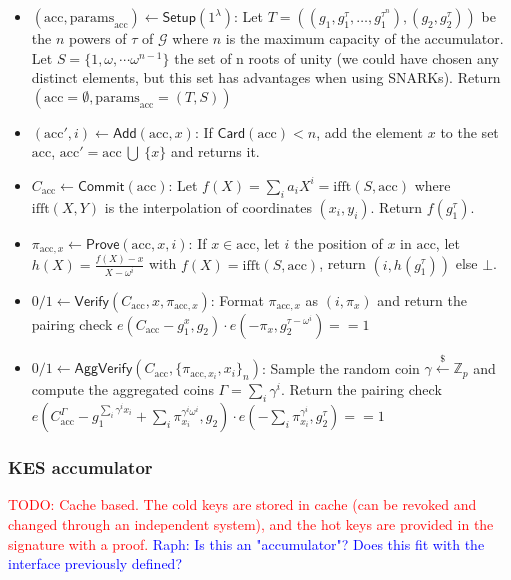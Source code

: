 \documentclass{article}
\newcommand{\isequal}{\ensuremath{==}\xspace}
\newcommand{\Zp}{\ensuremath{\mathbb{Z}_p}\xspace}
\newcommand{\e}[2]{\ensuremath{e(#1,\xspace #2)}\xspace}
\newcommand{\acc}{\ensuremath{\textrm{acc}}\xspace}
\newcommand{\pp}{\ensuremath{\textrm{params}}\xspace}
\newcommand{\Verify}{\ensuremath{\mathsf{Verify}}\xspace}
\newcommand{\AggVerify}{\ensuremath{\mathsf{AggVerify}}\xspace}
\newcommand{\Setup}{\ensuremath{\mathsf{Setup}}\xspace}
\newcommand{\Add}{\ensuremath{\mathsf{Add}}\xspace}
\newcommand{\Prove}{\ensuremath{\mathsf{Prove}}\xspace}
\newcommand{\Commit}{\ensuremath{\mathsf{Commit}}\xspace}
\newcommand{\sample}{\ensuremath{\xleftarrow{\$}}\xspace}
\newcommand{\raph}[1]{\textcolor{blue}{Raph: #1}\xspace}
\newcommand{\todo}[1]{\textcolor{red}{TODO: #1}\xspace}
\begin{document}
\begin{itemize}
    \item $(\acc, \pp_\acc) \leftarrow \Setup(1^\lambda)$: Let $T = ((g_1, g_1^\tau, \dots, g_1^{\tau^n}), (g_2, g_2^\tau))$ be the $n$ powers of $\tau$ of $\mathcal{G}$ where $n$ is the maximum capacity of the accumulator. Let $S =\{1, \omega, \cdots \omega^{n-1}\}$ the set of n roots of unity (we could have chosen any distinct elements, but this set has advantages when using SNARKs).  Return $(\acc = \emptyset, \pp_\acc = (T, S))$
    \item $(\acc', i) \leftarrow \Add(\acc, x)$: If $\textsf{Card}(\acc) < n$, add the element $x$ to the set \acc, $\acc' = \acc\ \bigcup\ \{x\}$ and returns it.
    \item $C_\acc \leftarrow \Commit(\acc)$: Let $f(X) = \sum_i a_i X^i = \text{ifft}(S, \acc)$ where $\text{ifft}(X,Y)$ is the interpolation of coordinates $(x_i,y_i)$. Return $f(g_1^\tau)$.
    \item $\pi_{\acc, x} \leftarrow \Prove(\acc, x, i)$: If $x \in \acc$, let $i$ the position of $x$ in $\acc$, let $h(X) = \frac{f(X) - x}{X-\omega^i}$ with $f(X) = \text{ifft}(S, \acc)$, return $(i, h(g_1^\tau))$ else $\bot$.
    \item $0/1 \leftarrow \Verify(C_\acc, x, \pi_{\acc, x})$: Format $\pi_{\acc, x}$ as $(i, \pi_x)$ and return the pairing check $\e{C_\acc - g_1^x}{g_2} \cdot \e{- \pi_x}{g_2^{\tau - \omega^i}} \isequal 1$
    \item $0/1 \leftarrow \AggVerify(C_\acc, \{\pi_{\acc, x_i}, x_i\}_n)$:
    Sample the random coin $\gamma \sample \Zp$ and compute the aggregated coins $\Gamma = \sum_i \gamma^i$. Return the pairing check $\e{C_\acc^\Gamma - g_1^{\sum_i \gamma^i x_i} + \sum_i \pi_{x_i}^{\gamma^i \omega^i}}{g_2} \cdot \e{- \sum_i \pi_{x_i}^{\gamma^i}}{g_2^{\tau}} \isequal 1$
\end{itemize}

%
\subsubsection{KES accumulator}
\todo{Cache based. The cold keys are stored in cache (can be revoked and changed through an independent system), and the hot keys are provided in the signature with a proof.} \raph{Is this an "accumulator"? Does this fit with the interface previously defined?}

%
%
\end{document}
